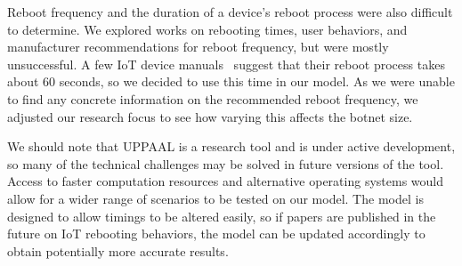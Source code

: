 \par
Reboot frequency and the duration of a device's reboot process were also difficult to determine. We explored works on rebooting times, user behaviors, and manufacturer recommendations for reboot frequency, but were mostly unsuccessful. A few IoT device manuals~\cite{comtrend_2012} suggest that their reboot process takes about 60 seconds, so we decided to use this time in our model. As we were unable to find any concrete information on the recommended reboot frequency, we adjusted our research focus to see how varying this affects the botnet size.
\par
We should note that UPPAAL is a research tool and is under active development, so many of the technical challenges may be solved in future versions of the tool. Access to faster computation resources and alternative operating systems would allow for a wider range of scenarios to be tested on our model. The model is designed to allow timings to be altered easily, so if papers are published in the future on IoT rebooting behaviors, the model can be updated accordingly to obtain potentially more accurate results.